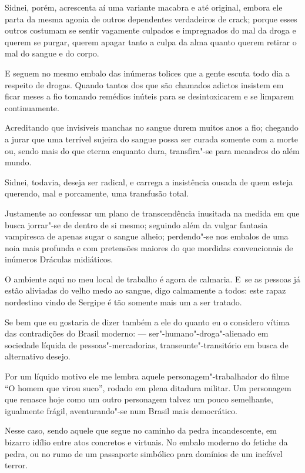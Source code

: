 Sidnei, porém, acrescenta aí uma variante macabra e até original, embora
ele parta da mesma agonia de outros dependentes verdadeiros de crack;
porque esses outros costumam se sentir vagamente culpados e impregnados
do mal da droga e querem se purgar, querem apagar tanto a culpa da alma
quanto querem retirar o mal do sangue e do corpo.

E seguem no mesmo embalo das inúmeras tolices que a gente escuta todo
dia a respeito de drogas. Quando tantos dos que são chamados adictos
insistem em ficar meses a fio tomando remédios inúteis para se
desintoxicarem e se limparem continuamente.

 

Acreditando que invisíveis manchas no sangue durem muitos anos a fio;
chegando a jurar que uma terrível sujeira do sangue possa ser curada
somente com a morte ou, sendo mais do que eterna enquanto dura,
transfira"-se para meandros do além mundo.

Sidnei, todavia, deseja ser radical, e carrega a insistência ousada de
quem esteja querendo, mal e porcamente, uma transfusão total.

Justamente ao confessar um plano de transcendência inusitada na medida
em que busca jorrar"-se de dentro de si mesmo; seguindo além da vulgar
fantasia vampiresca de apenas sugar o sangue alheio; perdendo"-se nos
embalos de uma noia mais profunda e com pretensões maiores do que
mordidas convencionais de inúmeros Dráculas midiáticos.

\asterisc{}

O ambiente aqui no meu local de trabalho é agora de calmaria. E~se as
pessoas já estão aliviadas do velho medo ao sangue, digo calmamente a
todos: este rapaz nordestino vindo de Sergipe é tão somente mais um a
ser tratado.

Se bem que eu gostaria de dizer também a ele do quanto eu o considero
vítima das contradições do Brasil moderno: --- ser"-humano"-droga"-alienado
em sociedade líquida de pessoas"-mercadorias, transeunte"-transitório em
busca de alternativo desejo.

Por um líquido motivo ele me lembra aquele personagem"-trabalhador do
filme ``O homem que virou suco'', rodado em plena ditadura militar. Um
personagem que renasce hoje como um outro personagem talvez um pouco
semelhante, igualmente frágil, aventurando"-se num Brasil mais
democrático.

Nesse caso, sendo aquele que segue no caminho da pedra incandescente, em
bizarro idílio entre atos concretos e virtuais. No embalo moderno do
fetiche da pedra, ou no rumo de um passaporte simbólico para domínios de
um inefável terror.

